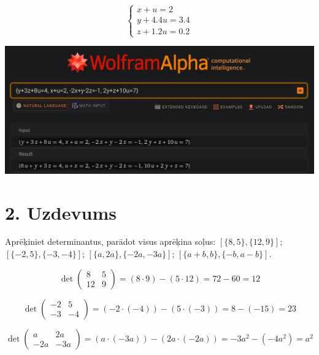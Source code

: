 \documentclass{article}
\begin{document}
\begin{equation*}
    \begin{cases}
        x + u = 2\\
        y + 4.4u = 3.4\\
        z + 1.2u = 0.2
    \end{cases}
\end{equation*}

\includegraphics[width=\textwidth]{1}

\clearpage

\section*{2. Uzdevums}

Aprēķiniet determinantus, parādot visus aprēķina soļus:\newline
$[\{8,5\},\{12, 9\}]$; $[\{-2,5\},\{-3,-4\}]$;\newline
$[\{a,2a\}, \{-2a, -3a\}]$; $[\{a+b, b\}, \{-b, a-b\}]$.

\begin{equation*}
\det
\begin{pmatrix}
    8 & 5\\
    12 & 9
\end{pmatrix} 
 =
(8 \cdot 9) - (5 \cdot 12)
= 
72 - 60
=
12
\end{equation*}

\begin{equation*}
    \det
    \begin{pmatrix}
        -2 & 5\\
        -3 & -4
    \end{pmatrix} 
     =
    (-2 \cdot (-4)) - (5 \cdot (-3))
    = 
    8 - (-15)
    =
    23
\end{equation*}

\begin{equation*}
    \det
    \begin{pmatrix}
        a & 2a\\
        -2a & -3a
    \end{pmatrix} 
    = 
    (a \cdot (-3a)) - (2a \cdot (-2a))
    = 
    -3a^2 - (-4a^2)
    =
    a^2
\end{equation*}
\end{document}

